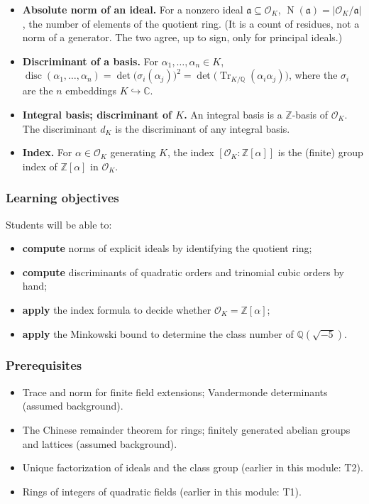 \documentclass[11pt]{article}
\newcommand{\Z}{\mathbb{Z}}
\newcommand{\Q}{\mathbb{Q}}
\newcommand{\C}{\mathbb{C}}
\newcommand{\OK}{\mathcal{O}_K}
\newcommand{\fa}{\mathfrak{a}}
\DeclareMathOperator{\Tr}{Tr}
\DeclareMathOperator{\Nm}{N}
\DeclareMathOperator{\disc}{disc}
\begin{document}
\begin{keydefs}
\begin{itemize}
  \item \textbf{Absolute norm of an ideal.} For a nonzero ideal $\fa\subseteq\OK$, $\Nm(\fa)=|\OK/\fa|$, the number of elements of the quotient ring. (It is a count of residues, not a norm of a generator. The two agree, up to sign, only for principal ideals.)
  \item \textbf{Discriminant of a basis.} For $\alpha_1,\dots,\alpha_n\in K$, $\disc(\alpha_1,\dots,\alpha_n)=\det\bigl(\sigma_i(\alpha_j)\bigr)^2=\det\bigl(\Tr_{K/\Q}(\alpha_i\alpha_j)\bigr)$, where the $\sigma_i$ are the $n$ embeddings $K\hookrightarrow\C$.
  \item \textbf{Integral basis; discriminant of $K$.} An integral basis is a $\Z$-basis of $\OK$. The discriminant $d_K$ is the discriminant of any integral basis.
  \item \textbf{Index.} For $\alpha\in\OK$ generating $K$, the index $[\OK:\Z[\alpha]]$ is the (finite) group index of $\Z[\alpha]$ in $\OK$.
\end{itemize}
\end{keydefs}

\subsubsection*{Learning objectives}
Students will be able to:
\begin{itemize}
  \item \textbf{compute} norms of explicit ideals by identifying the quotient ring;
  \item \textbf{compute} discriminants of quadratic orders and trinomial cubic orders by hand;
  \item \textbf{apply} the index formula to decide whether $\OK=\Z[\alpha]$;
  \item \textbf{apply} the Minkowski bound to determine the class number of $\Q(\sqrt{-5})$.
\end{itemize}

\subsubsection*{Prerequisites}
\begin{itemize}
  \item Trace and norm for finite field extensions; Vandermonde determinants (assumed background).
  \item The Chinese remainder theorem for rings; finitely generated abelian groups and lattices (assumed background).
  \item Unique factorization of ideals and the class group (earlier in this module: T2).
  \item Rings of integers of quadratic fields (earlier in this module: T1).
\end{itemize}
\end{document}

